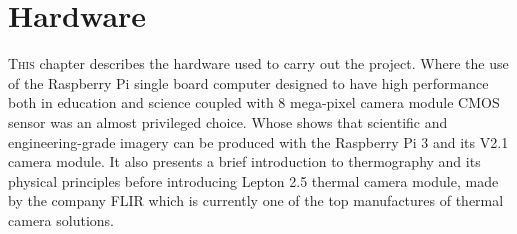 \chapter{Hardware}
\label{chap:hardware}
\lettrine[lines=3]{T}{his} chapter describes the hardware used to carry out the
project. Where the use of the Raspberry Pi single board computer designed to
have high performance both in education and science coupled with 8 mega-pixel
camera module CMOS sensor was an almost privileged choice. 
Whose shows that scientific and engineering-grade imagery can be produced with the Raspberry Pi 3  and its
V2.1 camera module.
It also presents a brief introduction to thermography and its physical principles before
introducing Lepton 2.5 thermal camera module, made by the company FLIR which is
currently one of the top manufactures of thermal camera solutions.
%

